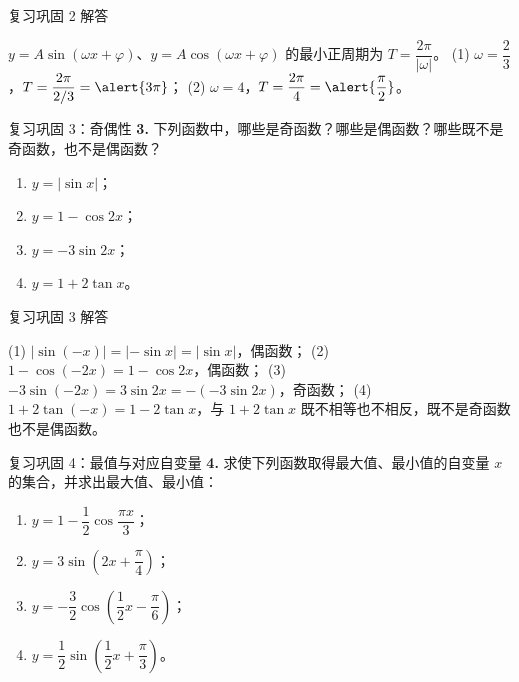 \documentclass[10pt,aspectratio=169,serif]{beamer}
\begin{document}
\begin{frame}[t]{复习巩固 2 解答}
\begin{tcolorbox}[colback=orange!10,colframe=orange,title=\textbf{解}]
$y=A\sin(\omega x+\varphi)$、$y=A\cos(\omega x+\varphi)$ 的最小正周期为 $T=\dfrac{2\pi}{|\omega|}$。
\vspace{0.3em}
(1) $\omega=\dfrac23$，$T=\dfrac{2\pi}{2/3}=\alert{3\pi}$；
\vspace{0.3em}
(2) $\omega=4$，$T=\dfrac{2\pi}{4}=\alert{\dfrac{\pi}{2}}$。
\end{tcolorbox}
\end{frame}

\begin{frame}[t]{复习巩固 3：奇偶性}
\textbf{3.} 下列函数中，哪些是奇函数？哪些是偶函数？哪些既不是奇函数，也不是偶函数？
\begin{enumerate}[(1)]
  \item $y=|\sin x|$； \qquad
  \item $y=1-\cos 2x$； \qquad
  \item $y=-3\sin 2x$； \qquad
  \item $y=1+2\tan x$。
\end{enumerate}
\end{frame}

\begin{frame}[t]{复习巩固 3 解答}
\begin{tcolorbox}[colback=orange!10,colframe=orange,title=\textbf{解}]
(1) $|\sin(-x)|=|-\sin x|=|\sin x|$，\alert{偶函数}；
\vspace{0.3em}
(2) $1-\cos(-2x)=1-\cos2x$，\alert{偶函数}；
\vspace{0.3em}
(3) $-3\sin(-2x)=3\sin2x=-(-3\sin2x)$，\alert{奇函数}；
\vspace{0.3em}
(4) $1+2\tan(-x)=1-2\tan x$，与 $1+2\tan x$ 既不相等也不相反，\alert{既不是奇函数也不是偶函数}。
\end{tcolorbox}
\end{frame}

\begin{frame}[t]{复习巩固 4：最值与对应自变量}
\textbf{4.} 求使下列函数取得最大值、最小值的自变量 $x$ 的集合，并求出最大值、最小值：
\begin{enumerate}[(1)]
  \item $y=1-\dfrac12\cos\dfrac{\pi x}{3}$； \qquad
  \item $y=3\sin\!\left(2x+\dfrac{\pi}{4}\right)$；
  \item $y=-\dfrac32\cos\!\left(\dfrac12x-\dfrac{\pi}{6}\right)$； \qquad
  \item $y=\dfrac12\sin\!\left(\dfrac12x+\dfrac{\pi}{3}\right)$。
\end{enumerate}
\end{frame}
\end{document}
